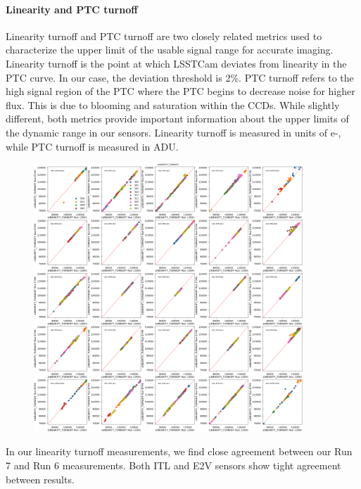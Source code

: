 \paragraph{Linearity and PTC turnoff}\label{linearity-and-ptc-turnoff}

Linearity turnoff and PTC turnoff are two closely related metrics used
to characterize the upper limit of the usable signal range for accurate
imaging. Linearity turnoff is the point at which LSSTCam deviates from
linearity in the PTC curve. In our case, the deviation threshold is 2\%.
PTC turnoff refers to the high signal region of the PTC where the PTC
begins to decrease noise for higher flux. This is due to blooming and
saturation within the CCDs. While slightly different, both metrics
provide important information about the upper limits of the dynamic
range in our sensors. Linearity turnoff is measured in units of e-,
while PTC turnoff is measured in ADU.

\begin{figure}
\begin{centering}
\includegraphics[width=0.9\textwidth]{sections/figures/baselineCharacterization/13591_E749_LINEARITY_TURNOFF.png}
\end{centering}
\end{figure}

In our linearity turnoff measurements, we find close agreement between
our Run 7 and Run 6 measurements. Both ITL and E2V sensors show tight
agreement between results.

